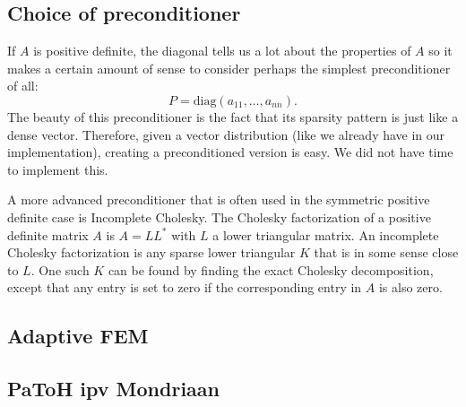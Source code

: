 \documentclass[11pt]{amsart}
\theoremstyle{definition}
\begin{document}
\subsection{Choice of preconditioner}
If $A$ is positive definite, the diagonal tells us a lot about the properties of $A$ so it makes a certain amount of sense to consider perhaps the simplest preconditioner of all:
\[
  P = \text{diag}(a_{11}, \ldots, a_{nn}).
\]
The beauty of this preconditioner is the fact that its sparsity pattern is just like a dense vector. Therefore, given a vector distribution (like we already have in our implementation), creating a preconditioned version is easy. We did not have time to implement this.

A more advanced preconditioner that is often used in the symmetric positive definite case is Incomplete Cholesky.  The Cholesky factorization of a positive definite matrix $A$ is $A = LL^*$ with $L$ a lower triangular matrix. An incomplete Cholesky factorization is any sparse lower triangular $K$ that is in some sense close to $L$. One such $K$ can be found by finding the exact Cholesky decomposition, except that any entry is set to zero if the corresponding entry in $A$ is also zero. \cite[\S11.5.8]{golub}
\subsection{Adaptive FEM}
\subsection{PaToH ipv Mondriaan}




\end{document}
